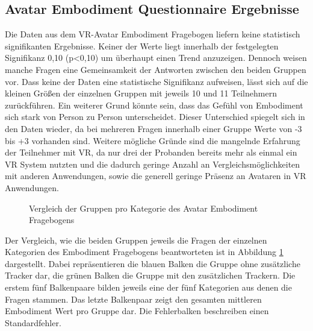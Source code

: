 \subsection{Avatar Embodiment Questionnaire Ergebnisse}
Die Daten aus dem VR-Avatar Embodiment Fragebogen liefern keine statistisch signifikanten Ergebnisse. Keiner der Werte liegt innerhalb der festgelegten Signifikanz 0,10 (p<0,10) um überhaupt einen Trend anzuzeigen. Dennoch weisen manche Fragen eine Gemeinsamkeit der Antworten zwischen den beiden Gruppen vor. Dass keine der Daten eine statistische Signifikanz aufweisen, lässt sich auf die kleinen Größen der einzelnen Gruppen mit jeweils 10 und 11 Teilnehmern zurückführen. Ein weiterer Grund könnte sein, dass das Gefühl von Embodiment sich stark von Person zu Person unterscheidet. Dieser Unterschied spiegelt sich in den Daten wieder, da bei mehreren Fragen innerhalb einer Gruppe Werte von -3 bis +3 vorhanden sind.
Weitere mögliche Gründe sind die mangelnde Erfahrung der Teilnehmer mit VR, da nur drei der Probanden bereits mehr als einmal ein VR System nutzten und die dadurch geringe Anzahl an Vergleichsmöglichkeiten mit anderen Anwendungen, sowie die generell geringe Präsenz an Avataren in VR Anwendungen.

\begin{figure}[h]
  \caption[Avatar Embodiment Durchschnitte pro Kategorie]{Vergleich der Gruppen pro Kategorie des Avatar Embodiment Fragebogens}
  \label{fig:TotalEmbodiment-Kategorien}
\end{figure}

Der Vergleich, wie die beiden Gruppen jeweils die Fragen der einzelnen Kategorien des Embodiment Fragebogens beantworteten ist in Abbildung \ref{fig:TotalEmbodiment-Kategorien} dargestellt. Dabei repräsentieren die blauen Balken die Gruppe ohne zusätzliche Tracker dar, die grünen Balken die Gruppe mit den zusätzlichen Trackern. Die erstem fünf Balkenpaare bilden jeweils eine der fünf Kategorien aus denen die Fragen stammen. Das letzte Balkenpaar zeigt den gesamten mittleren Embodiment Wert pro Gruppe dar. Die Fehlerbalken beschreiben einen Standardfehler.


